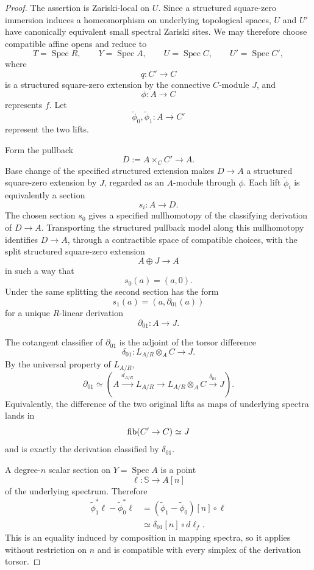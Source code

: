 \begin{proof}
The assertion is Zariski-local on \(U\).  Since a structured square-zero immersion induces a homeomorphism on underlying topological spaces, \(U\) and \(U'\) have canonically equivalent small spectral Zariski sites.  We may therefore choose compatible affine opens and reduce to
\[
    T=\operatorname{Spec}R,
    \qquad
    Y=\operatorname{Spec}A,
    \qquad
    U=\operatorname{Spec}C,
    \qquad
    U'=\operatorname{Spec}C',
\]
where
\[
    q:C'\longrightarrow C
\]
is a structured square-zero extension by the connective \(C\)-module \(J\), and
\[
    \phi:A\longrightarrow C
\]
represents \(f\).  Let
\[
    \widetilde\phi_0,\widetilde\phi_1:
    A\longrightarrow C'
\]
represent the two lifts.

Form the pullback
\[
    D:=A\times_C C'
    \longrightarrow
    A.
\]
Base change of the specified structured extension makes \(D\to A\) a structured square-zero extension by \(J\), regarded as an \(A\)-module through \(\phi\).  Each lift \(\widetilde\phi_i\) is equivalently a section
\[
    s_i:A\longrightarrow D.
\]
The chosen section \(s_0\) gives a specified nullhomotopy of the classifying derivation of \(D\to A\).  Transporting the structured pullback model along this nullhomotopy identifies \(D\to A\), through a contractible space of compatible choices, with the split structured square-zero extension
\[
    A\oplus J\longrightarrow A
\]
in such a way that
\[
    s_0(a)=(a,0).
\]
Under the same splitting the second section has the form
\[
    s_1(a)=(a,\partial_{01}(a))
\]
for a unique \(R\)-linear derivation
\[
    \partial_{01}:A\longrightarrow J.
\]

The cotangent classifier of \(\partial_{01}\) is the adjoint of the torsor difference
\[
    \delta_{01}:
    L_{A/R}\otimes_A C
    \longrightarrow
    J.
\]
By the universal property of \(L_{A/R}\),
\[
    \boxed{
    \partial_{01}
    \simeq
    \left(
      A\xrightarrow{d_{A/R}}L_{A/R}
      \longrightarrow
      L_{A/R}\otimes_A C
      \xrightarrow{\delta_{01}}
      J
    \right).
    }
\]  Equivalently, the difference of the two original lifts as maps of underlying spectra lands in
\[
    \operatorname{fib}(C'\to C)\simeq J
\]
and is exactly the derivation classified by \(\delta_{01}\).

A degree-\(n\) scalar section on \(Y=\operatorname{Spec}A\) is a point
\[
    \ell:\mathbb S\longrightarrow A[n]
\]
of the underlying spectrum.  Therefore
\[
\begin{aligned}
    \widetilde\phi_1^*\ell-\widetilde\phi_0^*\ell
    &=
    (\widetilde\phi_1-\widetilde\phi_0)[n]\circ\ell\\
    &\simeq
    \delta_{01}[n]\circ d\ell_f.
\end{aligned}
\]
This is an equality induced by composition in mapping spectra, so it applies without restriction on \(n\) and is compatible with every simplex of the derivation torsor.


\end{proof}
